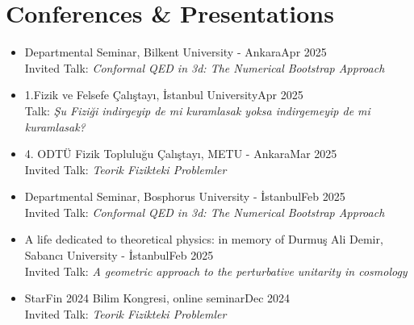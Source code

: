 \documentclass[a4paper,11pt]{article}
\begin{document}
\section{\textcolor{burntorange}{Conferences \& Presentations}}
\begin{itemize}[itemsep=.001em] 

\item[] Departmental Seminar, Bilkent University - Ankara\hfill Apr 2025
\\
\hspace*{1.8em}Invited Talk: \emph{Conformal QED in 3d: The Numerical Bootstrap Approach}

\item[] 1.Fizik ve Felsefe Çalıştayı, İstanbul University\hfill Apr 2025
\\
\hspace*{1.8em}Talk: \emph{Şu Fiziği indirgeyip de mi kuramlasak yoksa indirgemeyip de mi kuramlasak?}

\item[] 4. ODTÜ Fizik Topluluğu Çalıştayı, METU - Ankara\hfill Mar 2025
\\
\hspace*{1.8em}Invited Talk: \emph{Teorik Fizikteki Problemler}

\item[] Departmental Seminar, Bosphorus University - İstanbul\hfill Feb 2025
\\
\hspace*{1.8em}Invited Talk: \emph{Conformal QED in 3d: The Numerical Bootstrap Approach}

\item[] A life dedicated to theoretical physics: in memory of Durmuş Ali Demir, Sabancı University - İstanbul\hfill Feb 2025
\\
\hspace*{1.8em}Invited Talk: \emph{A geometric approach to the perturbative unitarity in cosmology}

\item[] StarFin 2024 Bilim Kongresi, online seminar\hfill Dec 2024
\\
\hspace*{1.8em}Invited Talk: \emph{Teorik Fizikteki Problemler}


\end{itemize}
\end{document}
